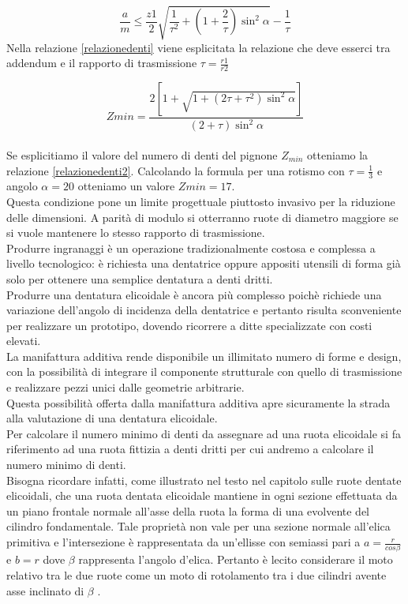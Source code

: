 \documentclass[%
corpo=11pt,
twoside,
 stile=classica,
oldstyle,
greek,%
]{toptesi}
\begin{document}
	\begin{equation}\label{relazionedenti}
	\frac{a}{m}\leq\frac{z1}{2}\sqrt{\frac{1}{\tau^2}+(1+\frac{2}{\tau})\sin^2\alpha} -\frac{1}{\tau}
	\end{equation}
	Nella relazione \ref{relazionedenti} viene esplicitata la relazione che deve esserci tra addendum e il rapporto di trasmissione $\tau=\frac{r1}{r2}$ 
	
	\begin{equation}\label{relazionedenti2}
	Zmin=\frac{2[1+\sqrt{1+(2\tau+\tau^2)\sin^2\alpha}]}{(2+\tau)\sin^2\alpha}
	\end{equation}
	\\Se esplicitiamo il valore del numero di denti del pignone $Z_{min}$ otteniamo la relazione \ref{relazionedenti2}.
	Calcolando la formula per una rotismo con $\tau=\frac{1}{3}$ e angolo $\alpha=20$ otteniamo un valore $Zmin=17$.\\
	Questa condizione pone un limite progettuale piuttosto invasivo per la riduzione delle dimensioni. A parità di modulo si otterranno ruote di diametro maggiore se si vuole mantenere lo stesso rapporto di trasmissione. \\
	Produrre ingranaggi è un operazione tradizionalmente costosa e complessa a livello tecnologico: è richiesta una dentatrice oppure appositi utensili di forma già solo per ottenere una semplice dentatura a denti dritti. \\
	Produrre una dentatura elicoidale è ancora più complesso poichè richiede una variazione dell'angolo di incidenza della dentatrice e pertanto risulta sconveniente per realizzare un prototipo, dovendo ricorrere a ditte specializzate con costi elevati. \\
	La manifattura additiva rende disponibile un illimitato numero di forme e design, con la possibilità di integrare il componente strutturale con quello di trasmissione e realizzare pezzi unici dalle geometrie arbitrarie. \\
	Questa possibilità offerta dalla manifattura additiva apre sicuramente la strada alla valutazione di una dentatura elicoidale. \\
	Per calcolare il numero minimo di denti da assegnare ad una ruota elicoidale si fa riferimento ad una ruota fittizia a denti dritti per cui andremo a calcolare il numero minimo di denti.\\
	Bisogna ricordare infatti, come illustrato nel testo \cite{Jacazioteo} nel capitolo sulle ruote dentate elicoidali, che una ruota dentata elicoidale mantiene in ogni sezione effettuata da un piano frontale normale all'asse della ruota la forma di una evolvente del cilindro fondamentale. Tale proprietà non vale per una sezione normale all'elica primitiva e l'intersezione è rappresentata da un'ellisse con semiassi pari a $a=\frac{r}{cos\beta}$ e $b=r$ dove $\beta$ rappresenta l'angolo d'elica. 
	Pertanto è lecito considerare il moto relativo tra le due ruote come un moto di rotolamento tra i due cilindri avente asse inclinato di $\beta$ .
	
\end{document}
